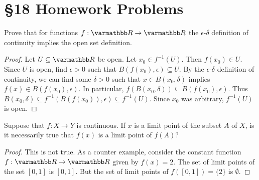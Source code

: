 \documentclass[12pt,twoside,openany]{memoir}
\begin{document}

\section*{\S 18 Homework Problems}
\begin{exercise}[manual-num={1}]
Prove that for functions $f:\bfR \rightarrow \bfR$ the $\epsilon$-$\delta$ definition of continuity implies the
open set definition.
\end{exercise}
    \begin{proof}
        Let $U \subseteq \bfR$ be open. Let $x_0 \in f^{-1}(U)$. Then $f(x_0) \in U$. Since $U$ is open, find $\epsilon > 0$ such that $B(f(x_0),\epsilon) \subseteq U$. By the $\epsilon$-$\delta$ definition of continuity, we can find some $\delta > 0$ such that $x \in B(x_0,\delta)$ implies $f(x) \in B(f(x_0),\epsilon)$. In particular, $f(B(x_0,\delta)) \subseteq B(f(x_0),\epsilon)$. Thus $B(x_0,\delta) \subseteq f^{-1}(B(f(x_0)),\epsilon) \subseteq f^{-1}(U)$. Since $x_0$ was arbitrary, $f^{-1}(U)$ is open.
    \end{proof}
\begin{exercise}[manual-num={2}]
Suppose that $f:X \rightarrow Y$ is continuous. If $x$ is a limit point of the subset $A$ of $X$, is it necessarily true that $f(x)$ is a limit point of $f(A)$?
\end{exercise}

\begin{proof}
    This is not true. As a counter example, consider the constant function $f:\bfR \rightarrow \bfR$ given by $f(x) = 2$. The set of limit points of the set $[0,1]$ is $[0,1]$. But the set of limit points of $f([0,1]) = \{2\}$ is $\emptyset$.
\end{proof}

\end{document}
